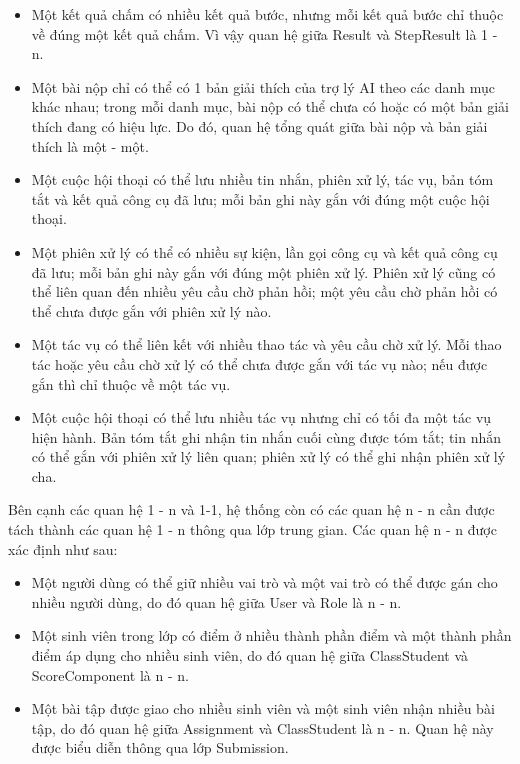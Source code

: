 \documentclass[../BTL.tex]{subfiles}
\begin{document}
\begin{itemize}[leftmargin=*, nosep]
    \item Một kết quả chấm có nhiều kết quả bước, nhưng mỗi kết quả bước chỉ thuộc về đúng một kết quả chấm. Vì vậy quan hệ giữa Result và StepResult là 1 - n.
    \item Một bài nộp chỉ có thể có 1 bản giải thích của trợ lý AI theo các danh mục khác nhau; trong mỗi danh mục, bài nộp có thể chưa có hoặc có một bản giải thích đang có hiệu lực. Do đó, quan hệ tổng quát giữa bài nộp và bản giải thích là một - một.
    \item Một cuộc hội thoại có thể lưu nhiều tin nhắn, phiên xử lý, tác vụ, bản tóm tắt và kết quả công cụ đã lưu; mỗi bản ghi này gắn với đúng một cuộc hội thoại.
    \item Một phiên xử lý có thể có nhiều sự kiện, lần gọi công cụ và kết quả công cụ đã lưu; mỗi bản ghi này gắn với đúng một phiên xử lý. Phiên xử lý cũng có thể liên quan đến nhiều yêu cầu chờ phản hồi; một yêu cầu chờ phản hồi có thể chưa được gắn với phiên xử lý nào.
    \item Một tác vụ có thể liên kết với nhiều thao tác và yêu cầu chờ xử lý. Mỗi thao tác hoặc yêu cầu chờ xử lý có thể chưa được gắn với tác vụ nào; nếu được gắn thì chỉ thuộc về một tác vụ.
    \item Một cuộc hội thoại có thể lưu nhiều tác vụ nhưng chỉ có tối đa một tác vụ hiện hành. Bản tóm tắt ghi nhận tin nhắn cuối cùng được tóm tắt; tin nhắn có thể gắn với phiên xử lý liên quan; phiên xử lý có thể ghi nhận phiên xử lý cha.
\end{itemize}

Bên cạnh các quan hệ 1 - n và 1-1, hệ thống còn có các quan hệ n - n cần được tách thành các quan hệ 1 - n thông qua lớp trung gian. Các quan hệ n - n được xác định như sau:

\begin{itemize}[leftmargin=*, nosep]
    \item Một người dùng có thể giữ nhiều vai trò và một vai trò có thể được gán cho nhiều người dùng, do đó quan hệ giữa User và Role là n - n.
    \item Một sinh viên trong lớp có điểm ở nhiều thành phần điểm và một thành phần điểm áp dụng cho nhiều sinh viên, do đó quan hệ giữa ClassStudent và ScoreComponent là n - n.
    \item Một bài tập được giao cho nhiều sinh viên và một sinh viên nhận nhiều bài tập, do đó quan hệ giữa Assignment và ClassStudent là n - n. Quan hệ này được biểu diễn thông qua lớp Submission.
\end{itemize}
\end{document}
